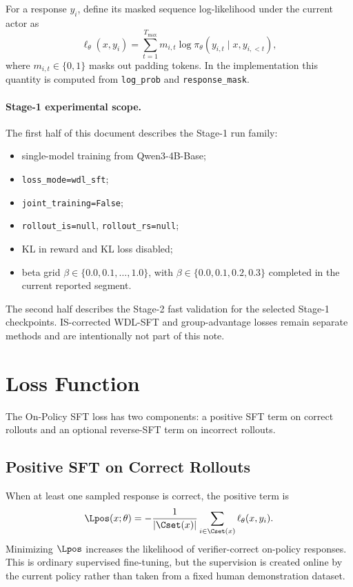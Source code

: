 For a response $y_i$, define its masked sequence log-likelihood under the
current actor as
\begin{equation}
    \ell_{\theta}(x,y_i)
    =
    \sum_{t=1}^{T_{\max}}
    m_{i,t}
    \log \pi_{\theta}(y_{i,t}\mid x,y_{i,<t}),
    \label{eq:opsft-seq-logprob}
\end{equation}
where $m_{i,t}\in\{0,1\}$ masks out padding tokens. In the implementation this
quantity is computed from \texttt{log\_prob} and \texttt{response\_mask}.

\paragraph{Stage-1 experimental scope.}
The first half of this document describes the Stage-1 run family:
\begin{itemize}[leftmargin=1.5em]
    \item single-model training from Qwen3-4B-Base;
    \item \texttt{loss\_mode=wdl\_sft};
    \item \texttt{joint\_training=False};
    \item \texttt{rollout\_is=null}, \texttt{rollout\_rs=null};
    \item KL in reward and KL loss disabled;
    \item beta grid $\beta\in\{0.0,0.1,\ldots,1.0\}$, with
    $\beta\in\{0.0,0.1,0.2,0.3\}$ completed in the current reported segment.
\end{itemize}
The second half describes the Stage-2 fast validation for the selected
Stage-1 checkpoints. IS-corrected WDL-SFT and group-advantage losses remain
separate methods and are intentionally not part of this note.

\section{Loss Function}
\label{sec:opsft-loss}

The On-Policy SFT loss has two components: a positive SFT term on correct
rollouts and an optional reverse-SFT term on incorrect rollouts.

\subsection{Positive SFT on Correct Rollouts}

When at least one sampled response is correct, the positive term is
\begin{equation}
    \Lpos(x;\theta)
    =
    -\frac{1}{|\Cset(x)|}
    \sum_{i\in\Cset(x)}
    \ell_{\theta}(x,y_i).
    \label{eq:opsft-lpos}
\end{equation}
Minimizing $\Lpos$ increases the likelihood of verifier-correct on-policy
responses. This is ordinary supervised fine-tuning, but the supervision is
created online by the current policy rather than taken from a fixed human
demonstration dataset.


